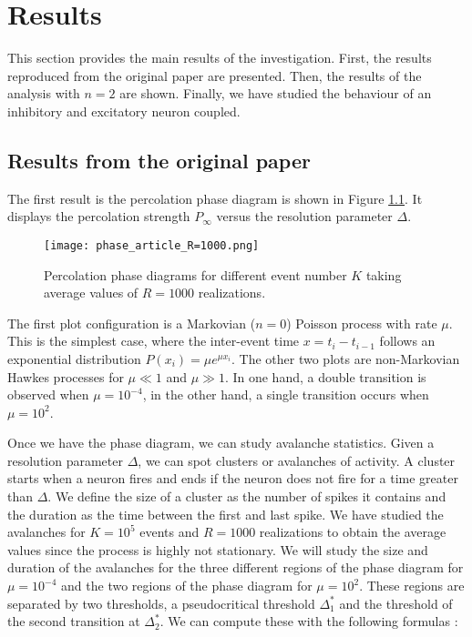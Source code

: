 \chapter{Results}

This section provides the main results of the investigation. First, the results reproduced from the original paper \cite{notarmuzi2021percolation} are presented. Then, the results of
the analysis with $n=2$ are shown. Finally, we have studied the behaviour of an inhibitory and excitatory neuron coupled.

\section{Results from the original paper}

The first result is the percolation phase diagram is shown in Figure \ref{f:phase_diagram_article}. It displays the percolation strength $P_{\infty}$ versus the resolution parameter $\Delta$.

\begin{figure}[H]
    \centering
    \texttt{[image: phase\_article\_R=1000.png]}
    \caption{Percolation phase diagrams for different event number $K$ taking average values of $R=1000$ realizations.}
    \label{f:phase_diagram_article}
\end{figure}

The first plot configuration is a Markovian ($n=0$) Poisson process with rate $\mu$. This is the simplest case, where the inter-event time $x=t_i-t_{i-1}$ follows an exponential 
distribution $P(x_i)=\mu e^{\mu x_i}$. The other two plots are non-Markovian Hawkes processes for $\mu \ll 1$ and $\mu\gg 1$. In one hand, a double transition is observed when 
$\mu = 10^{-4}$, in the other hand, a single transition occurs when $\mu = 10^2$. 

Once we have the phase diagram, we can study avalanche statistics. Given a resolution parameter $\Delta$, we can spot clusters or avalanches of activity.
A cluster starts when a neuron fires and ends if the neuron does not fire for a time greater than $\Delta$. We define the size of a cluster as the number of spikes it contains and the duration
as the time between the first and last spike. We have studied the avalanches for $K=10^5$ events and $R=1000$ realizations to obtain the average values since the process is highly not 
stationary. We will study the size and duration of the avalanches for the three different regions of the phase diagram for $\mu=10^{-4}$ and the two regions of the phase diagram for $\mu=10^2$.
These regions are separated by two thresholds, a pseudocritical threshold $\Delta_1^*$ and the threshold of the second transition at $\Delta_2^*$.
We can compute these with the following formulas \cite{notarmuzi2021percolation}:


